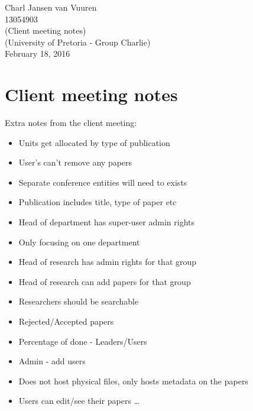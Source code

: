 \documentclass{article}
\begin{document}
	\begin{titlepage}
		\begin{center}
		\huge
		Charl Jansen van Vuuren \\
		13054903\\
		(Client meeting notes)\\
		[2cm]
		(University of Pretoria - Group Charlie)
		\\
		February 18, 2016
		
		
		\end{center}
	\end{titlepage}
	\newpage
	
	\section{Client meeting notes}
	Extra notes from the client meeting: 
		\begin{itemize}
		  \item Units get allocated by type of publication
		  \item User's can't remove any papers
		  \item Separate conference entities will need to exists
		  \item Publication includes title, type of paper etc
		  \item Head of department has super-user admin rights
		  \item Only focusing on one department
		  \item Head of research has admin rights for that group
		  \item Head of research can add papers for that group
		  \item Researchers should be searchable
		  \item Rejected/Accepted papers
		  \item Percentage of done - Leaders/Users
		  \item Admin - add users 
		  \item Does not host physical files, only hosts metadata on the papers
		  \item Users can edit/see their papers
		  \ldots
		\end{itemize}	
\end{document}

